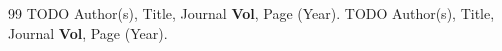 \documentclass[11pt]{article}
\begin{document}
\begin{thebibliography}{99}
 TODO Author(s), Title, Journal \textbf{Vol}, Page (Year).
 TODO Author(s), Title, Journal \textbf{Vol}, Page (Year).
\end{thebibliography}
\end{document}
